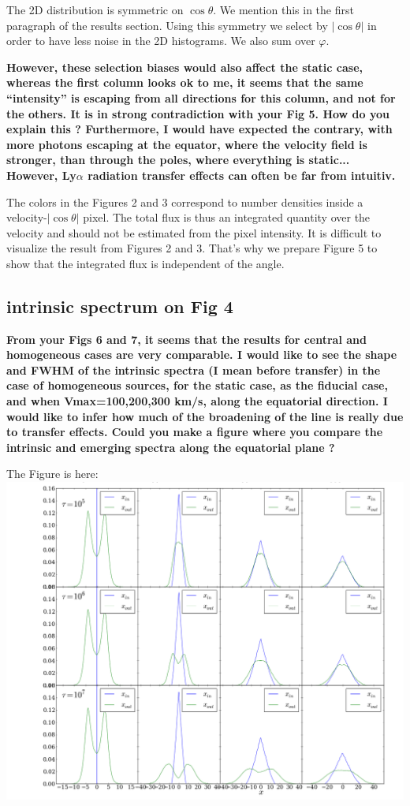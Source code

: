 \documentclass[12pt]{article}
\begin{document}
The 2D distribution is symmetric on $\cos\theta$. We mention this in
the first paragraph of the results section. Using this symmetry we select
by $|\cos\theta|$ in order to have less noise in the 2D histograms. We
also sum over $\varphi$.


{\bf However, these selection biases would also affect the static case, whereas the first column looks ok to me, it seems that the same “intensity” is escaping from all directions for this column, and not for the others.
It is in strong contradiction with your Fig 5. How do you explain this ?
Furthermore, I would have expected the contrary, with more photons
escaping at the equator, where the velocity field is stronger, than
through the poles, where everything is static... However, Ly$\alpha$
radiation transfer effects can often be far from intuitiv.}  

The colors in the Figures 2 and 3 correspond to number densities
inside a velocity-$|\cos\theta|$ pixel. The total flux is thus an
integrated quantity over the velocity and should not be estimated from
the pixel intensity. It is difficult to visualize
the result from Figures 2 and 3. That's why we prepare Figure 5 to
show that the integrated flux is independent of the angle. 


\subsection*{intrinsic spectrum on Fig 4}

{\bf From your Figs 6 and 7, it seems that the results for central and
  homogeneous cases are very comparable. I would like to see the shape
  and FWHM of the intrinsic spectra (I mean before transfer) in the
  case of homogeneous sources, for the static case, as the fiducial
  case, and when Vmax=100,200,300 km/s, along the equatorial
  direction. I would like to infer how much of the broadening of the
  line is really due to transfer effects. Could you make a figure
  where you compare the intrinsic and emerging spectra along the
  equatorial plane ?}  


The Figure is here:\\


\includegraphics[width=1.0\textwidth]{./intrinsic_spectrum.png}
\end{document}
